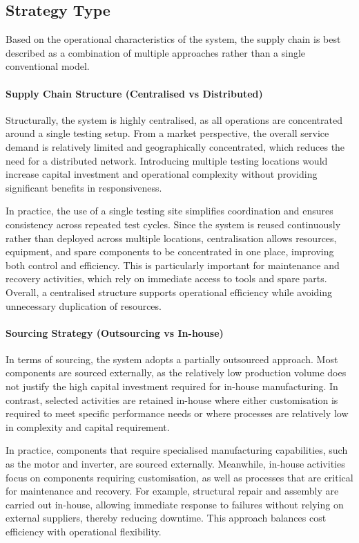 \documentclass[11pt, a4paper]{report}
\numberwithin{equation}{section}
\begin{document}
\subsection{Strategy Type}

Based on the operational characteristics of the system, the supply chain is best described as a combination of multiple approaches rather than a single conventional model.

\paragraph{Supply Chain Structure (Centralised vs Distributed)}

Structurally, the system is highly centralised, as all operations are concentrated around a single testing setup. From a market perspective, the overall service demand is relatively limited and geographically concentrated, which reduces the need for a distributed network. Introducing multiple testing locations would increase capital investment and operational complexity without providing significant benefits in responsiveness.

In practice, the use of a single testing site simplifies coordination and ensures consistency across repeated test cycles. Since the system is reused continuously rather than deployed across multiple locations, centralisation allows resources, equipment, and spare components to be concentrated in one place, improving both control and efficiency. This is particularly important for maintenance and recovery activities, which rely on immediate access to tools and spare parts. Overall, a centralised structure supports operational efficiency while avoiding unnecessary duplication of resources.

\paragraph{Sourcing Strategy (Outsourcing vs In-house)}

In terms of sourcing, the system adopts a partially outsourced approach. Most components are sourced externally, as the relatively low production volume does not justify the high capital investment required for in-house manufacturing. In contrast, selected activities are retained in-house where either customisation is required to meet specific performance needs or where processes are relatively low in complexity and capital requirement.

In practice, components that require specialised manufacturing capabilities, such as the motor and inverter, are sourced externally. Meanwhile, in-house activities focus on components requiring customisation, as well as processes that are critical for maintenance and recovery. For example, structural repair and assembly are carried out in-house, allowing immediate response to failures without relying on external suppliers, thereby reducing downtime. This approach balances cost efficiency with operational flexibility.
\end{document}
